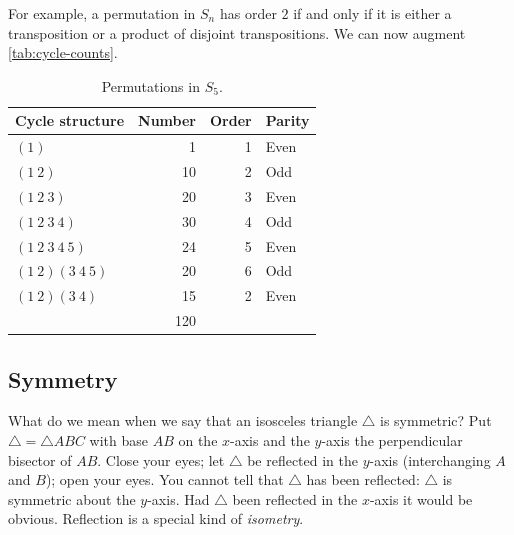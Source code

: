 For example, a permutation in \(S_n\) has order \(2\) if and only if it is either a
transposition or a product of disjoint transpositions. We can now augment
\autoref{tab:cycle-counts}.

\begin{table}[H]
	\centering
	\begin{tabular}{lrrl}
		\toprule
		Cycle structure     & Number & Order & Parity \\
		\midrule
		\((1)\)             & 1      & 1     & Even   \\
		\((1\ 2)\)          & 10     & 2     & Odd    \\
		\((1\ 2\ 3)\)       & 20     & 3     & Even   \\
		\((1\ 2\ 3\ 4)\)    & 30     & 4     & Odd    \\
		\((1\ 2\ 3\ 4\ 5)\) & 24     & 5     & Even   \\
		\((1\ 2)(3\ 4\ 5)\) & 20     & 6     & Odd    \\
		\((1\ 2)(3\ 4)\)    & 15     & 2     & Even   \\
		\midrule
		                    & 120    &       &        \\
		\bottomrule
	\end{tabular}
	\caption{Permutations in \(S_5\).}
	\label{tab:S5}
\end{table}

\subsection{Symmetry}

What do we mean when we say that an isosceles triangle \(\triangle\) is symmetric? Put
\(\triangle = \triangle ABC\) with base \(AB\) on the \(x\)-axis and the \(y\)-axis the
perpendicular bisector of \(AB\). Close your eyes; let \(\triangle\) be reflected in the
\(y\)-axis (interchanging \(A\) and \(B\)); open your eyes. You cannot tell that
\(\triangle\) has been reflected: \(\triangle\) is symmetric about the \(y\)-axis. Had
\(\triangle\) been reflected in the \(x\)-axis it would be obvious. Reflection is a
special kind of \emph{isometry}.

